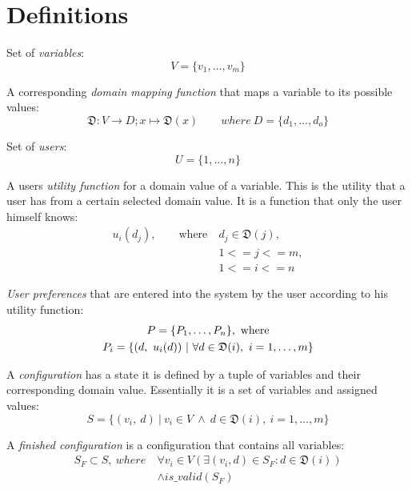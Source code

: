 \section{Definitions}

Set of \emph{variables}:
\begin{equation}
    V = \{v_1, \dotsc, v_m\}
\end{equation}

A corresponding \emph{domain mapping function} that maps a variable to its possible values:
\begin{equation}
    \mathfrak{D} : V \to D; x \mapsto \mathfrak{D}(x) \qquad where \ D = \{d_1, \dotsc, d_o\}
\end{equation}

Set of \emph{users}:
\begin{equation}
    U = \{1, \dotsc, n\}
\end{equation}

A users \emph{utility function} for a domain value of a variable. This is the utility that a user has from a certain selected domain value. It is a function that only the user himself knows:
\begin{equation}
    \begin{split}
        u_i(d_j), \qquad \text{where}\ & d_j \in  \mathfrak{D}(j),\\
        & 1 <= j <= m, \\
        & 1 <= i <= n
    \end{split}
\end{equation}

\emph{User preferences} that are entered into the system by the user according to his utility function:
\begin{gather}
    P = \{ P_1, \dotsc, P_n\},\ \text{where} \\
    P_i = \{(d,\ u_i(d)) \ | \ \forall d \in \mathfrak{D}(i),\ i=1,\dotsc,m \} \notag
\end{gather}

A \emph{configuration} has a state it is defined by a tuple of variables and their corresponding domain value. Essentially it is a set of variables and assigned values:
\begin{equation}
    S = \{ (v_i,\ d) \ |\ v_i \in V \ \land \ d \in \mathfrak{D}(i),\ i=1,\dotsc,m \}
\end{equation}

A \emph{finished configuration} is a configuration that contains all variables:
\begin{equation}
\begin{split}
    S_F \subset S,\ where \  & \forall v_i \in V (\exists (v_i, d) \in S_F : d \in \mathfrak{D}(i)) \\
    & \land is\_valid(S_F)
\end{split}
\end{equation}

